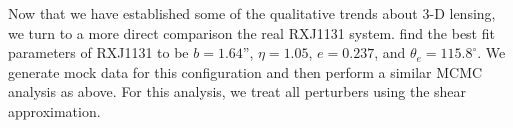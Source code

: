 Now that we have established some of the qualitative trends about 3-D lensing, we turn to a more direct comparison the real RXJ1131 system. \citet{Suyu13} find the best fit parameters of RXJ1131 to be $b = 1.64$'', $\eta = 1.05$, $e = 0.237$, and $\theta_e = 115.8^{\circ}$. We generate mock data for this configuration and then perform a similar MCMC analysis as above. For this analysis, we treat all perturbers using the shear approximation.